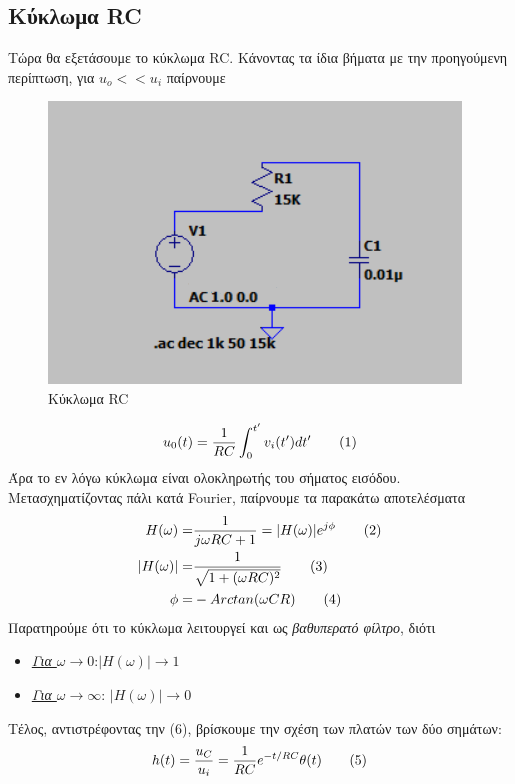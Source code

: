 \documentclass[a4paper]{article}
\newcommand\numberthis{\addtocounter{equation}{1}\tag{\theequation}}
\begin{document}
\subsection*{Κύκλωμα RC}
	Τώρα θα εξετάσουμε το κύκλωμα RC. Κάνοντας τα ίδια βήματα με την προηγούμενη περίπτωση, για  $u_o<<u_i$ παίρνουμε 
		\begin{figure}[h!]
			\centering 
			\includegraphics[scale=0.6]{./figures/RC.png}
			\caption{Κύκλωμα RC}
			\label{fig2}
		\end{figure}
	
		\begin{align*}
				u_0(t) = \frac{1}{RC}\int_{0}^{t'} v_i(t') dt' \numberthis
		\end{align*}
	Άρα το εν λόγω κύκλωμα είναι ολοκληρωτής του σήματος εισόδου. Μετασχηματίζοντας πάλι κατά Fourier, παίρνουμε τα παρακάτω αποτελέσματα
		\begin{align*}
			H(\omega) =& \frac{1}{j\omega RC + 1 }  = |H(\omega)| e^{j\phi}\numberthis\\
			|H(\omega)| =& \frac{1}{\sqrt{1+(\omega RC)^2}} \numberthis\\
			\phi        =& -Arctan(\omega CR)\numberthis
		\end{align*}
	Παρατηρούμε ότι το κύκλωμα λειτουργεί και ως \textit{βαθυπερατό φίλτρο}, διότι
		\begin{itemize}
			\item \underline{\textit{Για $\omega\rightarrow0$}}:$|H(\omega)| \rightarrow 1$
			
			\item \underline{\textit{Για $\omega\rightarrow\infty$}}: $|H(\omega)| \rightarrow 0$
		\end{itemize}	
	Τέλος, αντιστρέφοντας την (6), βρίσκουμε την σχέση των πλατών των δύο σημάτων: 
	\begin{align*}
		h(t) = \frac{u_C}{u_i} = \frac{1}{RC}e^{-t/RC}\theta(t) \numberthis
	\end{align*}
	
\end{document}
